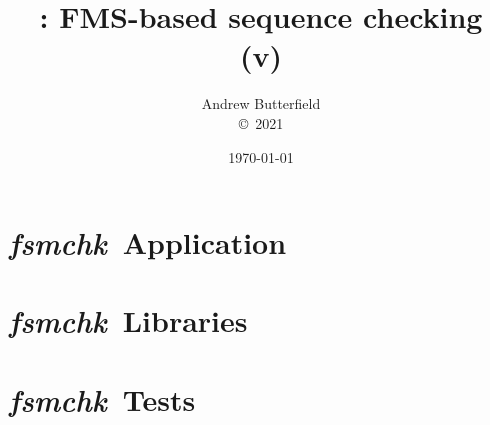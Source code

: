 \documentclass[fleqn,10pt]{report}
\author{
Andrew Butterfield
\\
{\small \copyright\ 2021}
}
\title{
  \FSMcheck: FMS-based sequence checking
  \\(v\FSMcheckVersion)
}
\date{
\today
}
\def\FSMcheck{\textit{\textsf{fsmchk}}}
\begin{document}
\maketitle
\tableofcontents


\chapter{\FSMcheck\ Application}



\chapter{\FSMcheck\ Libraries}



\chapter{\FSMcheck\ Tests}

% 



\end{document}
